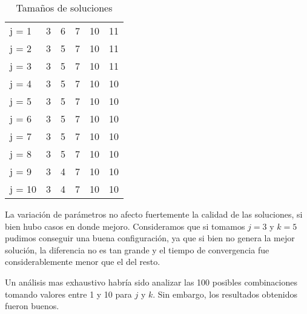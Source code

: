 \begin{table}[H]
\begin{tabular}{|l|lllll|}
j = 1  & 3                           & 6                           & 7                           & 10                          & 11     \\ \cline{1-1}
j = 2  & 3                           & 5                           & 7                           & 10                          & 11     \\ \cline{1-1}
j = 3  & 3                           & 5                           & 7                           & 10                          & 11     \\ \cline{1-1}
j = 4  & 3                           & 5                           & 7                           & 10                          & 10     \\ \cline{1-1}
j = 5  & 3                           & 5                           & 7                           & 10                          & 10     \\ \cline{1-1}
j = 6  & 3                           & 5                           & 7                           & 10                          & 10     \\ \cline{1-1}
j = 7  & 3                           & 5                           & 7                           & 10                          & 10     \\ \cline{1-1}
j = 8  & 3                           & 5                           & 7                           & 10                          & 10     \\ \cline{1-1}
j = 9  & 3                           & 4                           & 7                           & 10                          & 10     \\ \cline{1-1}
j = 10 & 3                           & 4                           & 7                           & 10                          & 10     \\ \hline
\end{tabular}
\caption{Tamaños de soluciones}
\end{table}

La variación de parámetros no afecto fuertemente la calidad de las soluciones, si bien hubo casos en donde mejoro. Consideramos que si tomamos $j = 3$ y $k = 5$ pudimos conseguir una buena configuración, ya que si bien no genera la mejor solución, la diferencia no es tan grande y el tiempo de convergencia fue considerablemente menor que el del resto.

Un análisis mas exhaustivo habría sido analizar las 100 posibles combinaciones tomando valores entre 1 y 10 para $j$ y $k$. Sin embargo, los resultados obtenidos fueron buenos.